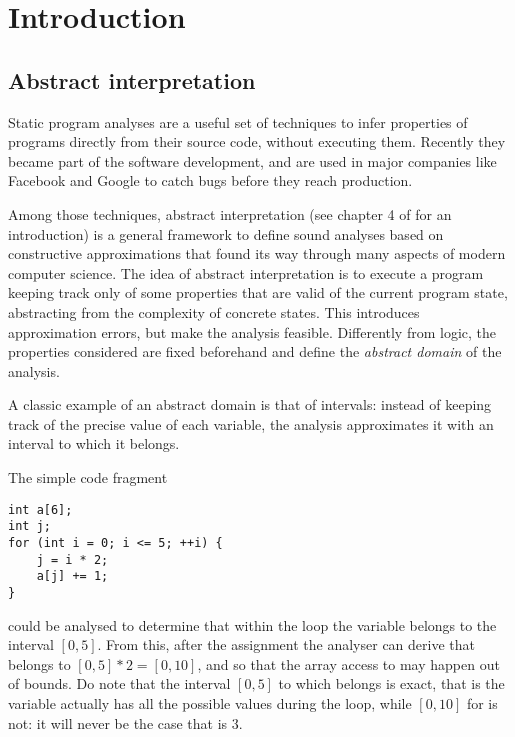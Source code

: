 \chapter{Introduction}
\section{Abstract interpretation}
Static program analyses are a useful set of techniques to infer properties of programs directly from their source code, without executing them. Recently they became part of the software development, and are used in major companies like Facebook \cite{distefano-static-analysis-fb} and Google \cite{static-analysis-google} to catch bugs before they reach production.

Among those techniques, abstract interpretation \cite{cousot-77,cousot-79,cousot-92} (see chapter 4 of \cite{principles-of-program-analysis-book} for an introduction) is a general framework to define sound analyses based on constructive approximations that found its way through many aspects of modern computer science.
The idea of abstract interpretation is to execute a program keeping track only of some properties that are valid of the current program state, abstracting from the complexity of concrete states. This introduces approximation errors, but make the analysis feasible. Differently from logic, the properties considered are fixed beforehand and define the \textit{abstract domain} of the analysis.

\begin{example}[Intervals]\label{intr:ex:intervals}
	A classic example of an abstract domain is that of intervals: instead of keeping track of the precise value of each variable, the analysis approximates it with an interval to which it belongs.

	The simple code fragment
	\begin{verbatim}
int a[6];
int j;
for (int i = 0; i <= 5; ++i) {
	j = i * 2;
	a[j] += 1;
}
	\end{verbatim}
	could be analysed to determine that within the loop the variable  belongs to the interval $[0, 5]$. From this, after the assignment  the analyser can derive that  belongs to $[0, 5] * 2 = [0, 10]$, and so that the array access to  may happen out of bounds.
	Do note that the interval $[0, 5]$ to which  belongs is exact, that is the variable actually has all the possible values during the loop, while $[0, 10]$ for  is not: it will never be the case that  is $3$.
\end{example}

